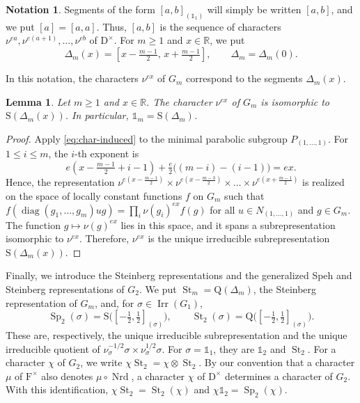 \documentclass[11pt]{amsart}
\numberwithin{equation}{section}
\theoremstyle{plain}
\newtheorem{lemma}[theorem]{Lemma}
\theoremstyle{definition}
\newtheorem{notation}[theorem]{Notation}
\theoremstyle{remark}
\newcommand{\R}{\mathbb{R}}
\newcommand{\one}{\mathds{1}}
\DeclareMathOperator{\Irr}{Irr}
\DeclareMathOperator{\Nrd}{Nrd}
\DeclareMathOperator{\St}{St}
\DeclareMathOperator{\Sp}{Sp}
\DeclareMathOperator{\diag}{diag}
\newcommand{\Ss}{\mathrm{S}}
\newcommand{\Qq}{\mathrm{Q}}
\begin{document}
\begin{notation}\label{not:line}
	Segments of the form $[a,b]_{(\one_1)}$ will simply be written $[a,b]$, and we put $[a]=[a,a]$. Thus, $[a,b]$ is the sequence of characters $\nu^{ea},\nu^{e(a+1)},\dots,\nu^{eb}$ of $\mathrm{D}^\times$. For $m\ge1$ and $x\in\R$, we put
	$$
	\Delta_m(x)=\left[x-\tfrac{m-1}2,\,x+\tfrac{m-1}2\right],\qquad \Delta_m=\Delta_m(0).
	$$
\end{notation}

In this notation, the characters $\nu^{ex}$ of $G_m$ correspond to the segments $\Delta_m(x)$.

\begin{lemma}\label{lem:characters-segments}
	Let $m\ge1$ and $x\in\R$. The character $\nu^{ex}$ of $G_m$ is isomorphic to $\Ss(\Delta_m(x))$. In particular, $\one_m=\Ss(\Delta_m)$.
\end{lemma}

\begin{proof}
	Apply \eqref{eq:char-induced} to the minimal parabolic subgroup $P_{(1,\dots,1)}$. For $1\le i\le m$, the $i$-th exponent is
	$$
	e\left(x-\tfrac{m-1}2+i-1\right)+\tfrac e2\big((m-i)-(i-1)\big)=ex.
	$$
	Hence, the representation $\nu^{e(x-\frac{m-1}2)}\times\nu^{e(x-\frac{m-3}2)}\times\dots\times\nu^{e(x+\frac{m-1}2)}$ is realized on the space of locally constant functions $f$ on $G_m$ such that $f(\diag(g_1,\dots,g_m)ug)=\prod_i\nu(g_i)^{ex}f(g)$ for all $u\in N_{(1,\dots,1)}$ and $g\in G_m$. The function $g\mapsto\nu(g)^{ex}$ lies in this space, and it spans a subrepresentation isomorphic to $\nu^{ex}$. Therefore, $\nu^{ex}$ is the unique irreducible subrepresentation $\Ss(\Delta_m(x))$.
\end{proof}

Finally, we introduce the Steinberg representations and the generalized Speh and Steinberg representations of $G_2$. We put $\St_m=\Qq(\Delta_m)$, the Steinberg representation of $G_m$, and, for $\sigma\in\Irr(G_1)$,
$$
\Sp_2(\sigma)=\Ss\big([-\tfrac12,\tfrac12]_{(\sigma)}\big),\qquad \St_2(\sigma)=\Qq\big([-\tfrac12,\tfrac12]_{(\sigma)}\big).
$$
These are, respectively, the unique irreducible subrepresentation and the unique irreducible quotient of $\nu_\sigma^{-1/2}\sigma\times\nu_\sigma^{1/2}\sigma$. For $\sigma=\one_1$, they are $\one_2$ and $\St_2$. For a character $\chi$ of $G_2$, we write $\chi\St_2=\chi\otimes\St_2$. By our convention that a character $\mu$ of $\mathrm{F}^\times$ also denotes $\mu\circ\Nrd$, a character $\chi$ of $\mathrm{D}^\times$ determines a character of $G_2$. With this identification, $\chi\St_2=\St_2(\chi)$ and $\chi\one_2=\Sp_2(\chi)$. 
\end{document}

